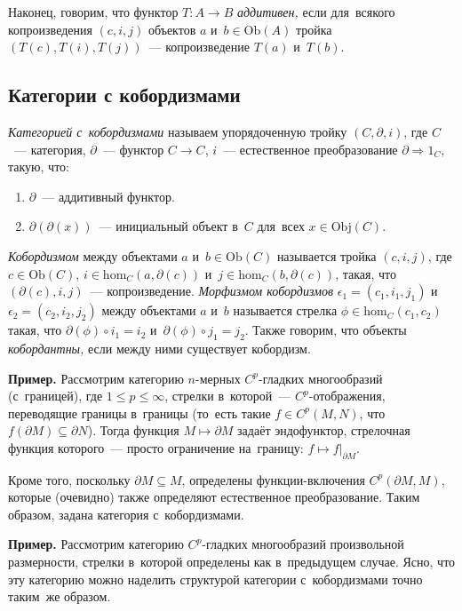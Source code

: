 \documentclass{article}
\begin{document}
Наконец, говорим, что функтор $T : A \rightarrow B$ \textit{аддитивен,} если для~всякого копроизведения $(c, i, j)$ объектов $a$ и~$b \in \mathrm{Ob}(A)$
тройка $(T(c), T(i), T(j))$~— копроизведение $T(a)$ и~$T(b)$.

\subsection{Категории с кобордизмами}

\textit{Категорией с~кобордизмами} называем упорядоченную тройку $(C, \partial, i)$, где $C$~— категория, $\partial$~— функтор $C \rightarrow C$,
$i$~— естественное преобразование $\partial \Rightarrow 1_C$, такую, что:
\begin{enumerate}
    \item $\partial$~— аддитивный функтор.
    \item $\partial(\partial(x))$~— инициальный объект в~$C$ для~всех $x \in \mathrm{Obj}(C)$.
\end{enumerate}

\textit{Кобордизмом} между объектами $a$ и~$b \in \mathrm{Ob}(C)$ называется тройка $(c, i, j)$,
где $c \in \mathrm{Ob}(C)$, $i \in \mathrm{hom}_C(a, \partial(c))$ и~$j \in \mathrm{hom}_C(b, \partial(c))$,
такая, что $(\partial(c), i, j)$~— копроизведение. \textit{Морфизмом кобордизмов} $\epsilon_1 = (c_1, i_1, j_1)$
и~$\epsilon_2 = (c_2, i_2, j_2)$ между объектами $a$ и~$b$ называется стрелка $\phi \in \mathrm{hom}_C(c_1, c_2)$
такая, что $\partial(\phi) \circ i_1 = i_2$ и~$\partial(\phi) \circ j_1 = j_2$. Также говорим, что объекты \textit{кобордантны,}
если между ними существует кобордизм.

\medskip
\noindent\textbf{Пример.} Рассмотрим категорию $n$-мерных $C^p$-гладких многообразий (с~границей), где $1 \leq p \leq \infty$,
стрелки в~которой~— $C^p$-отображения, переводящие границы в~границы (то~есть такие $f \in C^p(M, N)$,
что $f(\partial M) \subseteq \partial N$). Тогда функция $M \mapsto \partial M$ задаёт эндофунктор,
стрелочная функция которого~— просто ограничение на~границу: $f \mapsto f|_{\partial M}$.

Кроме того, поскольку $\partial M \subseteq M$, определены функции-включения $C^p(\partial M, M)$,
которые (очевидно) также определяют естественное преобразование. Таким образом, задана категория с~кобордизмами.
\medskip

\noindent\textbf{Пример.} Рассмотрим категорию $C^p$-гладких многообразий произвольной размерности,
стрелки в~которой определены как в~предыдущем случае. Ясно, что эту категорию можно наделить структурой
категории с~кобордизмами точно таким~же образом.
\end{document}
